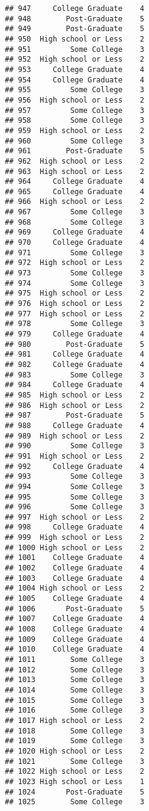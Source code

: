 \documentclass[
]{article}
\begin{document}
\begin{verbatim}
## 947     College Graduate    4
## 948        Post-Graduate    5
## 949        Post-Graduate    5
## 950  High school or Less    2
## 951         Some College    3
## 952  High school or Less    2
## 953     College Graduate    4
## 954     College Graduate    4
## 955         Some College    3
## 956  High school or Less    2
## 957         Some College    3
## 958         Some College    3
## 959  High school or Less    2
## 960         Some College    3
## 961        Post-Graduate    5
## 962  High school or Less    2
## 963  High school or Less    2
## 964     College Graduate    4
## 965     College Graduate    4
## 966  High school or Less    2
## 967         Some College    3
## 968         Some College    3
## 969     College Graduate    4
## 970     College Graduate    4
## 971         Some College    3
## 972  High school or Less    2
## 973         Some College    3
## 974         Some College    3
## 975  High school or Less    2
## 976  High school or Less    2
## 977  High school or Less    2
## 978         Some College    3
## 979     College Graduate    4
## 980        Post-Graduate    5
## 981     College Graduate    4
## 982     College Graduate    4
## 983         Some College    3
## 984     College Graduate    4
## 985  High school or Less    2
## 986  High school or Less    2
## 987        Post-Graduate    5
## 988     College Graduate    4
## 989  High school or Less    2
## 990         Some College    3
## 991  High school or Less    2
## 992     College Graduate    4
## 993         Some College    3
## 994         Some College    3
## 995         Some College    3
## 996         Some College    3
## 997  High school or Less    2
## 998     College Graduate    4
## 999  High school or Less    2
## 1000 High school or Less    2
## 1001    College Graduate    4
## 1002    College Graduate    4
## 1003    College Graduate    4
## 1004 High school or Less    2
## 1005    College Graduate    4
## 1006       Post-Graduate    5
## 1007    College Graduate    4
## 1008    College Graduate    4
## 1009    College Graduate    4
## 1010    College Graduate    4
## 1011        Some College    3
## 1012        Some College    3
## 1013        Some College    3
## 1014        Some College    3
## 1015        Some College    3
## 1016        Some College    3
## 1017 High school or Less    2
## 1018        Some College    3
## 1019        Some College    3
## 1020 High school or Less    2
## 1021        Some College    3
## 1022 High school or Less    2
## 1023 High school or Less    1
## 1024       Post-Graduate    5
## 1025        Some College    3

\end{verbatim}
\end{document}

